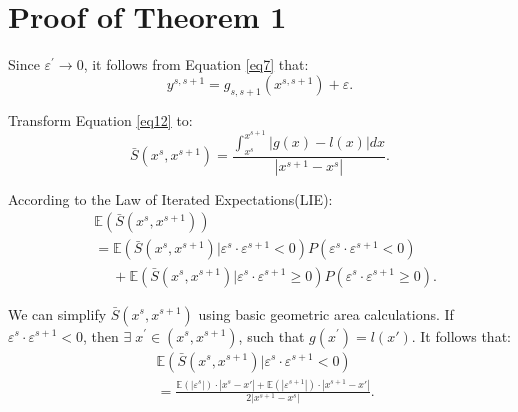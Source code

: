 \documentclass[lettersize,journal]{IEEEtran}
\begin{document}
{%

\section*{Proof of Theorem 1}
Since $\varepsilon^\prime\rightarrow0$, it follows from 
Equation \eqref{eq7} that:
\begin{equation*}
y^{s,s+1}=g_{s,s+1}(x^{s,s+1})+\varepsilon.
\end{equation*}

Transform Equation \eqref{eq12} to:
\begin{equation*}
\bar{S}(x^s,x^{s+1})=\frac{\int_{x^s}^{x^{s+1}}|g(x)-l(x)|
 dx}{|x^{s+1}-x^s|}.
\end{equation*}

According to the Law of Iterated Expectations(LIE):
\begin{equation*}
\begin{aligned}
&\mathbb{E}(\bar{S}(x^s,x^{s+1})) \\
&=\mathbb{E}(\bar{S}(x^s,x^{s+1})|\varepsilon^s\cdot\varepsilon^{s+1}<0)P(\varepsilon^s\cdot\varepsilon^{s+1}<0)\\
&\quad\; +\mathbb{E}(\bar{S}(x^s,x^{s+1})|\varepsilon^s\cdot\varepsilon^{s+1}\ge0)P(\varepsilon^s\cdot\varepsilon^{s+1}\ge0).
\end{aligned}
\end{equation*}

We can simplify $\bar{S}(x^s,x^{s+1})$ using basic 
geometric area calculations. If $\varepsilon^s\cdot
\varepsilon^{s+1}<0$, then $\exists\; x^\prime\in
(x^s,x^{s+1})$, such that $g(x^\prime)=l(x\prime)$. 
It follows that:
\begin{equation*}
\begin{aligned}
&\mathbb{E}(\bar{S}(x^s,x^{s+1})|\varepsilon^s\cdot
\varepsilon^{s+1}<0)\\
&=\frac{\mathbb{E}(|\varepsilon^s|)
\cdot|x^s-x'|+\mathbb{E}(|\varepsilon^{s+1}|)\cdot
|x^{s+1}-x'|}{2|x^{s+1}-x^s|}.
\end{aligned}
\end{equation*}

}
\end{document}
